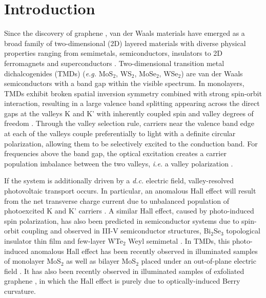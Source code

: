 \documentclass[reprint,amsmath,amssymb,aps,prb]{revtex4-1}
\begin{document}
\section{Introduction} \label{sec:intro}

Since the discovery of graphene \cite{novoselov2004electric}, van der Waals materials have emerged as a broad family of two-dimensional (2D) layered materials with diverse physical properties ranging from semimetals, semiconductors, insulators to 2D ferromagnets and superconductors \cite{novoselov20162d}.
Two-dimensional transition metal dichalcogenides (TMDs) (\textit{e.g.} MoS$_2$, WS$_2$, MoSe$_2$, WSe$_2$) are van der Waals semiconductors with a band gap within the visible spectrum. In monolayers, TMDs exhibit broken spatial inversion symmetry combined with strong spin-orbit interaction, resulting in a large valence band splitting 
appearing across the direct gaps at the valleys K and K' \cite{zhu2011giant} with inherently coupled spin and valley degrees of freedom  \cite{xiao2012coupled}. Through the valley selection rule, carriers near the valence band edge at each of the valleys couple preferentially to light with a definite circular polarization, allowing them to be selectively excited to the conduction band. 
For frequencies above the band gap, the optical excitation creates a carrier population imbalance between the two valleys, \textit{i.e.} a valley polarization \cite{cao2012valley}.


If the system is additionally driven by a \textit{d.c.} electric field, valley-resolved photovoltaic transport occurs. In particular, an anomalous Hall effect will result from the net transverse charge current due to  unbalanced population of  photoexcited K and K' carriers \cite{valley_Niu_1,valley_Niu_2}. 
A similar Hall effect, caused by photo-induced spin polarization, has also been predicted \cite{AHE_Zhang} in semiconductor systems due to spin-orbit coupling and observed \cite{AHE_Exp1, AHE_Exp2, AHE_Exp3,AHE_Exp4} in III-V semiconductor structures, Bi$_2$Se$_3$ topological insulator thin film \cite{AHE_Exp5} and few-layer WTe$_2$ Weyl semimetal \cite{AHE_Exp6}. In TMDs, this photo-induced anomalous Hall effect has been recently observed in illuminated samples of monolayer MoS$_2$ as well as bilayer MoS$_2$ placed under an  out-of-plane electric field \cite{mak2014valley,lee2016electrical}. It  has also been recently observed in illuminated samples of exfoliated graphene \cite{AHE_Exp7,AHE_Exp8}, in which the Hall effect is purely due to optically-induced Berry curvature.
\end{document}
